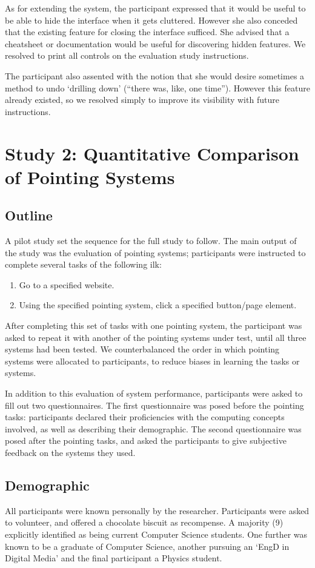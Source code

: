 \documentclass[a4paper, 12pt]{report}
\begin{document}
As for extending the system, the participant expressed that it would be useful to be able to hide the interface when it gets cluttered. However she also conceded that the existing feature for closing the interface sufficed. She advised that a cheatsheet or documentation would be useful for discovering hidden features. We resolved to print all controls on the evaluation study instructions.

The participant also assented with the notion that she would desire sometimes a method to undo `drilling down' (``there was, like, one time''). However this feature already existed, so we resolved simply to improve its visibility with future instructions.

\section{Study 2: Quantitative Comparison of Pointing Systems}
\subsection{Outline}
A pilot study set the sequence for the full study to follow. The main output of the study was the evaluation of pointing systems; participants were instructed to complete several tasks of the following ilk:
\begin{enumerate}
\item Go to a specified website.
\item Using the specified pointing system, click a specified button/page element.
\end{enumerate}
After completing this set of tasks with one pointing system, the participant was asked to repeat it with another of the pointing systems under test, until all three systems had been tested. We counterbalanced the order in which pointing systems were allocated to participants, to reduce biases in learning the tasks or systems.

In addition to this evaluation of system performance, participants were asked to fill out two questionnaires. The first questionnaire was posed before the pointing tasks: participants declared their proficiencies with the computing concepts involved, as well as describing their demographic. The second questionnaire was posed after the pointing tasks, and asked the participants to give subjective feedback on the systems they used.

\subsection{Demographic}
All participants were known personally by the researcher. Participants were asked to volunteer, and offered a chocolate biscuit as recompense. A majority (9) explicitly identified as being current Computer Science students. One further was known to be a graduate of Computer Science, another pursuing an `EngD in Digital Media' and the final participant a Physics student.
\end{document}
